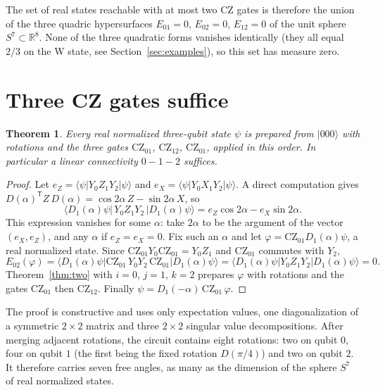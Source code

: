 \documentclass[11pt,a4paper]{article}
\newtheorem{theorem}{Theorem}
\theoremstyle{definition}
\theoremstyle{plain}
\newcommand{\ket}[1]{\lvert#1\rangle}
\newcommand{\bra}[1]{\langle#1\rvert}
\newcommand{\R}{\mathbb{R}}
\newcommand{\T}{\mathsf{T}}
\newcommand{\CZ}{\mathrm{CZ}}
\begin{document}
The set of real states reachable with at most two CZ gates is therefore the
union of the three quadric hypersurfaces $E_{01}=0$, $E_{02}=0$, $E_{12}=0$ of
the unit sphere $S^7\subset\R^8$. None of the three quadratic forms vanishes
identically (they all equal $2/3$ on the W state, see
Section~\ref{sec:examples}), so this set has measure zero.

\section{Three CZ gates suffice}\label{sec:three}
\begin{theorem}\label{thm:three}
Every real normalized three-qubit state $\psi$ is prepared from $\ket{000}$ with
rotations and the three gates $\CZ_{01}$, $\CZ_{12}$, $\CZ_{01}$, applied in
this order. In particular a linear connectivity $0-1-2$ suffices.
\end{theorem}

\begin{proof}
Let $e_Z=\bra\psi Y_0Z_1Y_2\ket\psi$ and $e_X=\bra\psi Y_0X_1Y_2\ket\psi$. A
direct computation gives $D(\alpha)^\T Z\,D(\alpha)=\cos2\alpha\,Z-\sin2\alpha\,X$,
so
\[
\bra{D_1(\alpha)\psi}\,Y_0Z_1Y_2\,\ket{D_1(\alpha)\psi}=e_Z\cos2\alpha-e_X\sin2\alpha .
\]
This expression vanishes for some $\alpha$: take $2\alpha$ to be the argument of
the vector $(e_X,e_Z)$, and any $\alpha$ if $e_Z=e_X=0$. Fix such an $\alpha$ and
let $\varphi=\CZ_{01}D_1(\alpha)\psi$, a real normalized state. Since
$\CZ_{01}Y_0\CZ_{01}=Y_0Z_1$ and $\CZ_{01}$ commutes with $Y_2$,
\[
E_{02}(\varphi)=\bra{D_1(\alpha)\psi}\CZ_{01}\,Y_0Y_2\,\CZ_{01}\ket{D_1(\alpha)\psi}
=\bra{D_1(\alpha)\psi}Y_0Z_1Y_2\ket{D_1(\alpha)\psi}=0 .
\]
Theorem~\ref{thm:two} with $i=0$, $j=1$, $k=2$ prepares $\varphi$ with
rotations and the gates $\CZ_{01}$ then $\CZ_{12}$. Finally
$\psi=D_1(-\alpha)\,\CZ_{01}\,\varphi$.
\end{proof}

The proof is constructive and uses only expectation values, one
diagonalization of a symmetric $2\times2$ matrix and three $2\times2$ singular
value decompositions. After merging adjacent rotations, the circuit contains
eight rotations: two on qubit $0$, four on qubit $1$ (the first being the
fixed rotation $D(\pi/4)$) and two on qubit $2$. It therefore carries seven
free angles, as many as the dimension of the sphere $S^7$ of real normalized
states.
\end{document}
